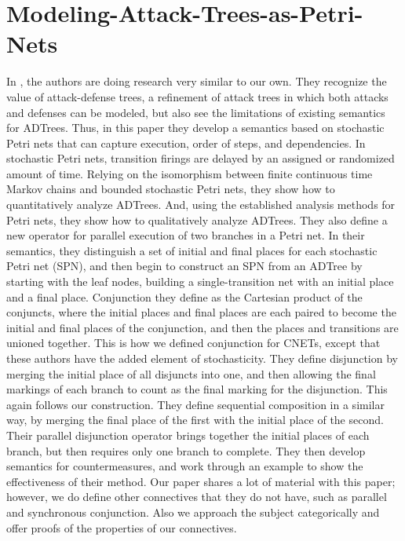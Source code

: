 \section{Modeling-Attack-Trees-as-Petri-Nets}
\par In \cite{LOUNIS2018135}, the authors are doing research very similar to our own. They recognize the value of attack-defense trees, a refinement of attack trees in which both attacks and defenses can be modeled, but also see the limitations of existing semantics for ADTrees. Thus, in this paper they develop a semantics based on stochastic Petri nets that can capture execution, order of steps, and dependencies. In stochastic Petri nets, transition firings are delayed by an assigned or randomized amount of time. Relying on the isomorphism between finite continuous time Markov chains and bounded stochastic Petri nets, they show how to quantitatively analyze ADTrees. And, using the established analysis methods for Petri nets, they show how to qualitatively analyze ADTrees. They also define a new operator for parallel execution of two branches in a Petri net. In their semantics, they distinguish a set of initial and final places for each stochastic Petri net (SPN), and then begin to construct an SPN from an ADTree by starting with the leaf nodes, building a single-transition net with an initial place and a final place. Conjunction they define as the Cartesian product of the conjuncts, where the initial places and final places are each paired to become the initial and final places of the conjunction, and then the places and transitions are unioned together. This is how we defined conjunction for CNETs, except that these authors have the added element of stochasticity. They define disjunction by merging the initial place of all disjuncts into one, and then allowing the final markings of each branch to count as the final marking for the disjunction. This again follows our construction.  They define sequential composition in a similar way, by merging the final place of the first with the initial place of the second. Their parallel disjunction operator brings together the initial places of each branch, but then requires only one branch to complete.  They then develop semantics for countermeasures, and work through an example to show the effectiveness of their method. Our paper shares a lot of material with this paper; however, we do define other connectives that they do not have, such as parallel and synchronous conjunction. Also we approach the subject categorically and offer proofs of the properties of our connectives.  
